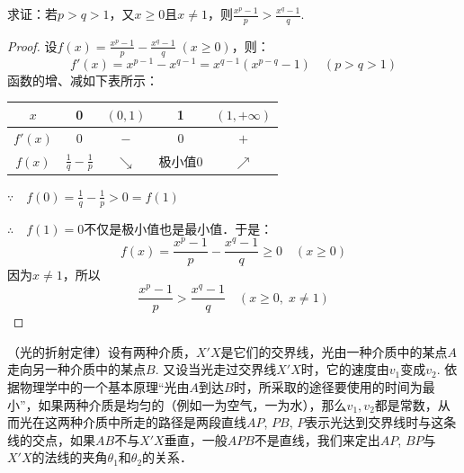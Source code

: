 \begin{example}
    求证：若$p>q>1$，又$x\ge 0$且$x\ne 1$，则$\frac{x^p-1}{p}>\frac{x^q-1}{q}$.
\end{example}

\begin{proof}
设$f(x)=\frac{x^p-1}{p}-\frac{x^q-1}{q}\; (x\ge 0)$，则：
\[f'(x)=x^{p-1}-x^{q-1}=x^{q-1}\left(x^{p-q}-1\right)\quad (p>q>1)\]
    函数的增、减如下表所示：
\begin{center}
\begin{tabular}{c|cccc}
\hline
$x$&0&$(0,1)$&1& $(1,+\infty)$\\
\hline
$f'(x)$&0&$-$&0&$+$\\
$f(x)$&$\frac{1}{q}-\frac{1}{p}$&$\searrow$&极小值0& $\nearrow$\\ 
\hline
    \end{tabular}
\end{center}

$\because\quad f(0)=\frac{1}{q}-\frac{1}{p}>0=f(1)$

$\therefore\quad f(1)=0$不仅是极小值也是最小值．于是：
\[f(x)=\frac{x^p-1}{p}-\frac{x^q-1}{q}\ge 0\quad (x\ge 0)\]
因为$x\ne 1$，所以
\[\frac{x^p-1}{p}>\frac{x^q-1}{q}\quad (x\ge 0,\; x\ne 1)\]
\end{proof}

\begin{example}
 （光的折射定律）设有两种介质，$X'X$是它们的交界线，光由一种介质中的某点$A$走向另一种介质中的某点$B$. 又设当光走过交界线$X'X$时，它的速度由$v_1$变成$v_2$. 依据物理学中的一个基本原理“光由$A$到达$B$时，所采取的途径要使用的时间为最小”，如果两种介质是均匀的（例如一为空气，一为水），那么$v_1,v_2$都是常数，从而光在这两种介质中所走的路径是两段直线$AP$, $PB$, $P$表示光达到交界线时与这条线的交点，如果$AB$不与$X'X$垂直，一般$APB$不是直线，我们来定出$AP$, $BP$与$X'X$的法线的夹角$\theta_1$和$\theta_2$的关系．
\end{example}

    \begin{figure}[htp]
    \centering
{}
    \caption{}
\end{figure}

